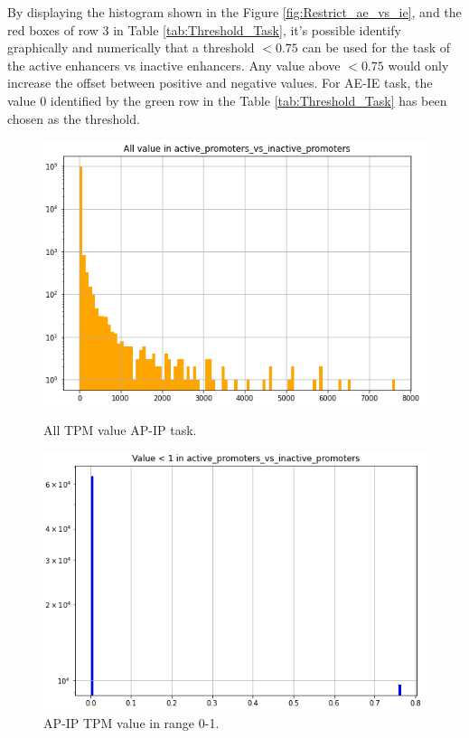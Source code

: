 \documentclass{article}
\begin{document}
\noindent\newline
By displaying the histogram shown in the Figure \ref{fig:Restrict_ae_vs_ie}, and the red boxes of row 3 in Table \ref{tab:Threshold_Task}, it's possible identify graphically and numerically that a threshold $< 0.75$ can be used for the task of the active enhancers vs inactive enhancers. Any value above $< 0.75$ would only increase the offset between positive and negative values. For \acrshort{AE-IE} task, the value $0$ identified by the green row in the Table \ref{tab:Threshold_Task} has been chosen as the threshold.

\begin{figure}[!ht]
    \begin{center}
        \begin{minipage}[t]{.8\textwidth}
            \centering
            \includegraphics[width=\textwidth]{image/All_ap_vs_ip.PNG}
            \caption{All TPM value \acrshort{AP-IP} task.}
            \label{fig:All_ap_vs_ip}
        \end{minipage}
        \begin{minipage}[t]{.8\textwidth}
            \centering
            \includegraphics[width=\textwidth]{image/Restrict_ap_vs_ip.PNG}
            \caption{\acrshort{AP-IP} TPM value in range 0-1.}
            \label{fig:Restrict_ap_vs_ip}
        \end{minipage}
    \end{center}
\end{figure}
\end{document}
